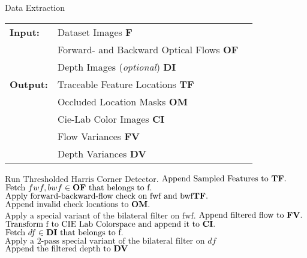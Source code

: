 \begin{algorithm}[H]
\caption{Data Extraction}
\begin{table}[H]
  \begin{tabular}{@{}lll@{}}
    \textbf{Input:} & Dataset Images \bf{F} \\
		& Forward- and Backward Optical Flows \bf{OF} \\
 		& Depth Images (\emph{optional}) \bf{DI} \\
    \textbf{Output:} & Traceable Feature Locations \bf{TF} \\
    & Occluded Location Masks \bf{OM}\\
    & Cie-Lab Color Images \bf{CI} \\
    & Flow Variances \bf{FV} \\
    & Depth Variances \bf{DV} \\
    
  \end{tabular} 
\end{table}
\setlength{\fboxrule}{0pt} 
\begin{boxedminipage}{1.0\textwidth}
  \begin{algorithmic}[1]
        \State $\text{Run Thresholded Harris Corner Detector}.$
		\State $\text{Append Sampled Features to } \bf{TF}.$
		\State $\text{Fetch } fwf,bwf \in \bf{OF} \text{ that belongs to f}.$
		\State $\text{Apply forward-backward-flow check on fwf and bwf} \bf{TF}.$
		\State $\text{Append invalid check locations to } \bf{OM}.$
		\State $\text{Apply a special variant of the bilateral filter on fwf}.$
		\State $\text{Append filtered flow to } \bf{FV}.$
		\State $\text{Transform f to CIE Lab Colorspace and append it to } \bf{CI}.$
		\State $\text{Fetch } df \in \bf{DI} \text{ that belongs to f}.$
		\State $\text{Apply a 2-pass special variant of the bilateral filter on } df$
		\State $\text{Append the filtered depth to } \bf{DV}$
      \EndFor
  \end{algorithmic}
  \end{boxedminipage}
  \vskip1.5pt
\label{alg:data_extraction}
\end{algorithm}

